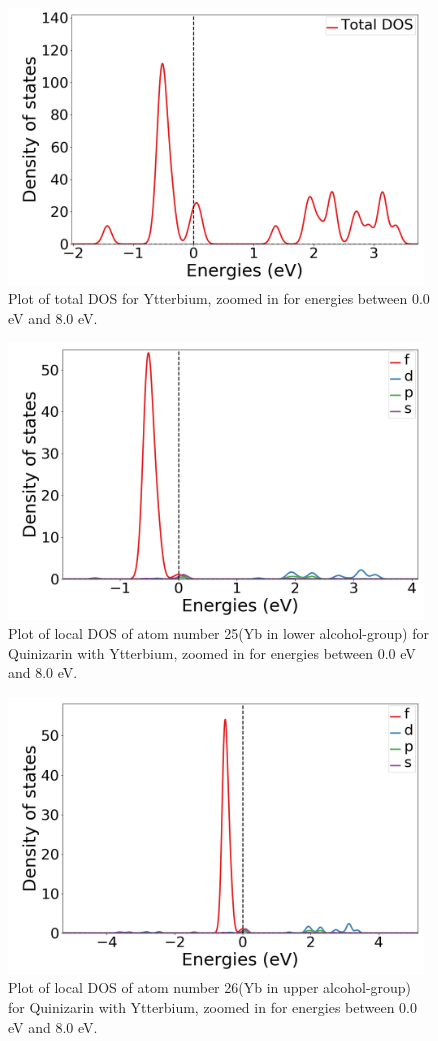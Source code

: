 \documentclass{article}
\begin{document}
      \begin{figure}[H]
        \centering
        \includegraphics[width = 11cm]{../fig/Yb_TDOS_2.png}
        \caption{Plot of total DOS for Ytterbium, zoomed in for energies between 0.0 eV and 8.0 eV. }
        \label{fig:Yb_TDOS_2}
      \end{figure}

      \begin{figure}[H]
          \centering
          \includegraphics[width = 11cm]{../fig/Yb_LDOS25_2.png}
          \caption{Plot of local DOS of atom number 25(Yb in lower alcohol-group) for Quinizarin with Ytterbium, zoomed in for energies between 0.0 eV and 8.0 eV. }
          \label{fig:Yb_LDOS25_2}
      \end{figure}

      \begin{figure}[H]
          \centering
          \includegraphics[width = 11cm]{../fig/Yb_LDOS26_2.png}
          \caption{Plot of local DOS of atom number 26(Yb in upper alcohol-group) for Quinizarin with Ytterbium, zoomed in for energies between 0.0 eV and 8.0 eV. }
          \label{fig:Yb_LDOS26_2}
      \end{figure}
\end{document}
